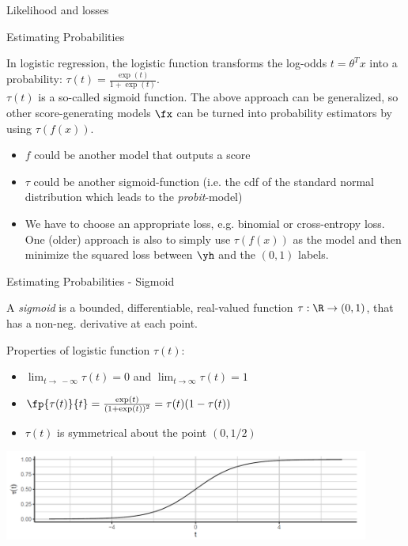 \begin{vbframe}{Likelihood and losses}
\end{vbframe}



\begin{vbframe}{Estimating Probabilities}

In logistic regression, the logistic function transforms the log-odds $t = \theta^Tx$ into a probability:
$\tau(t) = \frac{\exp(t)}{1 + \exp(t)}$.\\
\lz
$\tau(t)$ is a so-called sigmoid function.
The above approach can be generalized, so other score-generating models $\fx$ can be turned into
probability estimators by using $\tau(f(x))$.

\begin{itemize}
\item $f$ could be another model that outputs a score
\item $\tau$ could be another sigmoid-function (i.e. the cdf of the standard normal distribution which leads to the \emph{probit}-model)
\item We have to choose an appropriate loss, e.g. binomial or cross-entropy loss.
  One (older) approach is also to simply use $\tau(f(x))$ as the model and then minimize the squared loss
  between $\yh$ and the $(0,1)$ labels.
\end{itemize}
\end{vbframe}

\begin{vbframe}{Estimating Probabilities - Sigmoid}

  A \emph{sigmoid} is a bounded, differentiable, real-valued function $\tau: \R \to (0,1)$, that has a non-neg. derivative at each point.
\lz

  Properties of logistic function $\tau(t)$:
\begin{itemize}
\item $\lim_{t \to\ -\infty} \tau(t) = 0$ and  $\lim_{t \to \infty} \tau(t) = 1$
\item $\fp {\tau(t)}{t}=\frac{\exp(t)}{(1+\exp(t))^2} = \tau(t)(1-\tau(t))$
\item $\tau(t)$ is symmetrical about the point $(0, 1/2)$
\end{itemize}

\begin{center}
\includegraphics[width=0.9\textwidth]{plots/sigmoid.png}
\end{center}

\framebreak

\end{vbframe}

